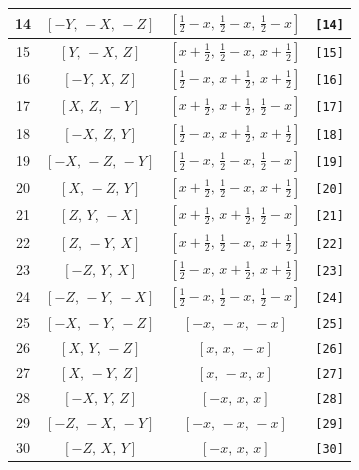 \documentclass[fleqn,8pt]{jsarticle}
\begin{document}
\begin{longtable}{cccc}
14 & $\left[ - Y,\, - X,\, - Z \right]$ & $\left[ \frac{1}{2} - x,\, \frac{1}{2} - x,\, \frac{1}{2} - x \right]$ & {\tt [14]} \\ \hline
15 & $\left[ Y,\, - X,\, Z \right]$ & $\left[ x + \frac{1}{2},\, \frac{1}{2} - x,\, x + \frac{1}{2} \right]$ & {\tt [15]} \\ \hline
16 & $\left[ - Y,\, X,\, Z \right]$ & $\left[ \frac{1}{2} - x,\, x + \frac{1}{2},\, x + \frac{1}{2} \right]$ & {\tt [16]} \\ \hline
17 & $\left[ X,\, Z,\, - Y \right]$ & $\left[ x + \frac{1}{2},\, x + \frac{1}{2},\, \frac{1}{2} - x \right]$ & {\tt [17]} \\ \hline
18 & $\left[ - X,\, Z,\, Y \right]$ & $\left[ \frac{1}{2} - x,\, x + \frac{1}{2},\, x + \frac{1}{2} \right]$ & {\tt [18]} \\ \hline
19 & $\left[ - X,\, - Z,\, - Y \right]$ & $\left[ \frac{1}{2} - x,\, \frac{1}{2} - x,\, \frac{1}{2} - x \right]$ & {\tt [19]} \\ \hline
20 & $\left[ X,\, - Z,\, Y \right]$ & $\left[ x + \frac{1}{2},\, \frac{1}{2} - x,\, x + \frac{1}{2} \right]$ & {\tt [20]} \\ \hline
21 & $\left[ Z,\, Y,\, - X \right]$ & $\left[ x + \frac{1}{2},\, x + \frac{1}{2},\, \frac{1}{2} - x \right]$ & {\tt [21]} \\ \hline
22 & $\left[ Z,\, - Y,\, X \right]$ & $\left[ x + \frac{1}{2},\, \frac{1}{2} - x,\, x + \frac{1}{2} \right]$ & {\tt [22]} \\ \hline
23 & $\left[ - Z,\, Y,\, X \right]$ & $\left[ \frac{1}{2} - x,\, x + \frac{1}{2},\, x + \frac{1}{2} \right]$ & {\tt [23]} \\ \hline
24 & $\left[ - Z,\, - Y,\, - X \right]$ & $\left[ \frac{1}{2} - x,\, \frac{1}{2} - x,\, \frac{1}{2} - x \right]$ & {\tt [24]} \\ \hline
25 & $\left[ - X,\, - Y,\, - Z \right]$ & $\left[ - x,\, - x,\, - x \right]$ & {\tt [25]} \\ \hline
26 & $\left[ X,\, Y,\, - Z \right]$ & $\left[ x,\, x,\, - x \right]$ & {\tt [26]} \\ \hline
27 & $\left[ X,\, - Y,\, Z \right]$ & $\left[ x,\, - x,\, x \right]$ & {\tt [27]} \\ \hline
28 & $\left[ - X,\, Y,\, Z \right]$ & $\left[ - x,\, x,\, x \right]$ & {\tt [28]} \\ \hline
29 & $\left[ - Z,\, - X,\, - Y \right]$ & $\left[ - x,\, - x,\, - x \right]$ & {\tt [29]} \\ \hline
30 & $\left[ - Z,\, X,\, Y \right]$ & $\left[ - x,\, x,\, x \right]$ & {\tt [30]} \\ \hline

\end{longtable}
\end{document}
